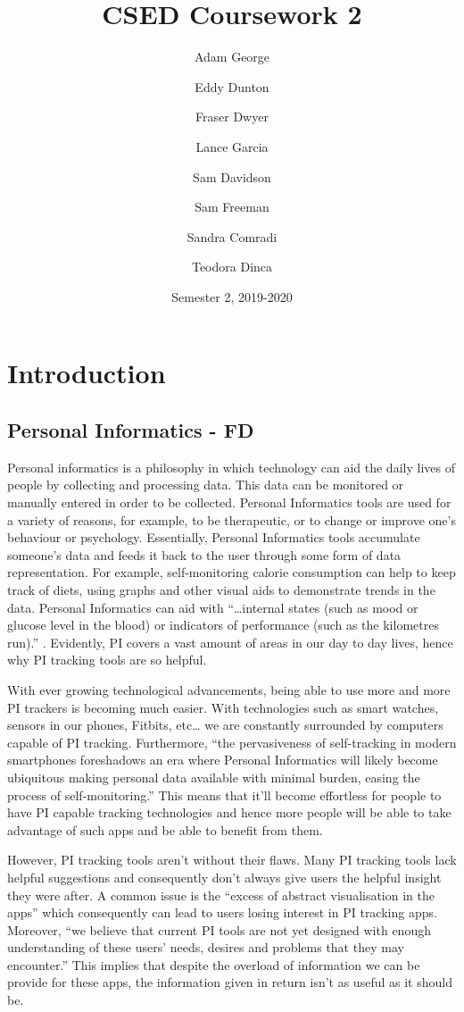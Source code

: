 \documentclass[12pt]{report}
\title{CSED Coursework 2}
\author{
	Adam George
	\and
	Eddy Dunton
	\and
	Fraser Dwyer
	\and	
	Lance Garcia
	\and
	Sam Davidson
	\and
	Sam Freeman
	\and
	Sandra Comradi
	\and
	Teodora Dinca
}
\date{Semester 2,  2019-2020}
\begin{document}
\begin{titlepage}
\maketitle
\end{titlepage}

\tableofcontents

\chapter{Introduction}

\section{Personal Informatics - FD}

Personal informatics is a philosophy in which technology can aid the daily lives of people by collecting and processing data. This data can be monitored or manually entered in order to be collected. Personal Informatics tools are used for a variety of reasons, for example, to be therapeutic, or to change or improve one’s behaviour or psychology. Essentially, Personal Informatics tools accumulate someone’s data and feeds it back to the user through some form of data representation. For example, self-monitoring calorie consumption can help to keep track of diets, using graphs and other visual aids to demonstrate trends in the data. Personal Informatics can aid with “…internal states (such as mood or glucose level in the blood) or indicators of performance (such as the kilometres run).”  \cite{Rapp2014a} . Evidently, PI covers a vast amount of areas in our day to day lives, hence why PI tracking tools are so helpful.

With ever growing technological advancements, being able to use more and more PI trackers is becoming much easier. With technologies such as smart watches, sensors in our phones, Fitbits, etc… we are constantly surrounded by computers capable of PI tracking. Furthermore, “the pervasiveness of self-tracking in modern smartphones foreshadows an era where Personal Informatics will likely become ubiquitous making personal data available with minimal burden, easing the process of self-monitoring.” This means that it’ll become effortless for people to have PI capable tracking technologies and hence more people will be able to take advantage of such apps and be able to benefit from them.\cite{Rapp2016}

However, PI tracking tools aren’t without their flaws. Many PI tracking tools lack helpful suggestions and consequently don’t always give users the helpful insight they were after. A common issue is the “excess of abstract visualisation in the apps” \cite{Rapp2016} which consequently can lead to users losing interest in PI tracking apps. Moreover, “we believe that current PI tools are not yet designed with enough understanding of these users’ needs, desires and problems that they may encounter.” \cite{Rapp2016} This implies that despite the overload of information we can be provide for these apps, the information given in return isn’t as useful as it should be.
\end{document}
